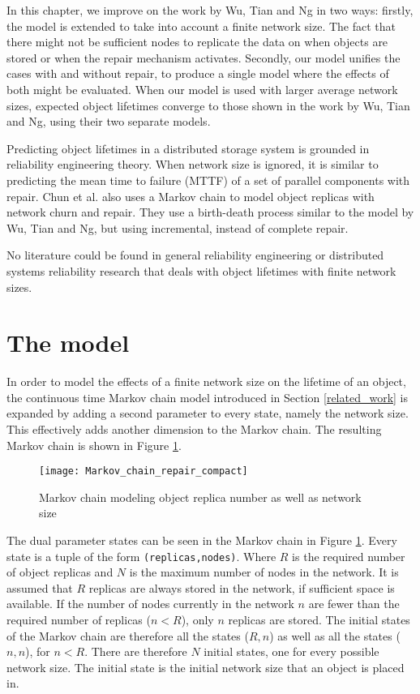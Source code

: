 In this chapter, we improve on the work by Wu, Tian and Ng \cite{replication_article} in two ways: firstly, the model is extended to take into account a finite network size. The fact that there might not be sufficient nodes to replicate the data on when objects are stored or when the repair mechanism activates. Secondly, our model unifies the cases with and without repair, to produce a single model where the effects of both might be evaluated. When our model is used with larger average network sizes, expected object lifetimes converge to those shown in the work by Wu, Tian and Ng, using their two separate models.

Predicting object lifetimes in a distributed storage system is grounded in reliability engineering theory. When network size is ignored, it is similar to predicting the mean time to failure (MTTF) of a set of parallel components with repair. Chun et al. \cite{Chun:2006_replica_maintenance} also uses a Markov chain to model object replicas with network churn and repair. They use a birth-death process similar to the model by Wu, Tian and Ng, but using incremental, instead of complete repair.

No literature could be found in general reliability engineering or distributed systems reliability research that deals with object lifetimes with finite network sizes.

\section{The model}
\label{model}

In order to model the effects of a finite network size on the lifetime of an object, the continuous time Markov chain model introduced in Section \ref{related_work} is expanded by adding a second parameter to every state, namely the network size. This effectively adds another dimension to the Markov chain. The resulting Markov chain is shown in Figure \ref{fig_markov_chain}.

\begin{figure}[htbp]
 \centering
 \texttt{[image: Markov\_chain\_repair\_compact]}
 \caption{Markov chain modeling object replica number as well as network size}
 \label{fig_markov_chain}
\end{figure}


The dual parameter states can be seen in the Markov chain in Figure \ref{fig_markov_chain}. Every state is a tuple of the form \verb.(replicas,nodes).. Where $R$ is the required number of object replicas and $N$ is the maximum number of nodes in the network. It is assumed that $R$ replicas are always stored in the network, if sufficient space is available. If the number of nodes currently in the network $n$ are fewer than the required number of replicas ($n < R$), only $n$ replicas are stored. The initial states of the Markov chain are therefore all the states ($R,n$) as well as all the states ($n,n$), for $n < R$. There are therefore $N$ initial states, one for every possible network size. The initial state is the initial network size that an object is placed in.

